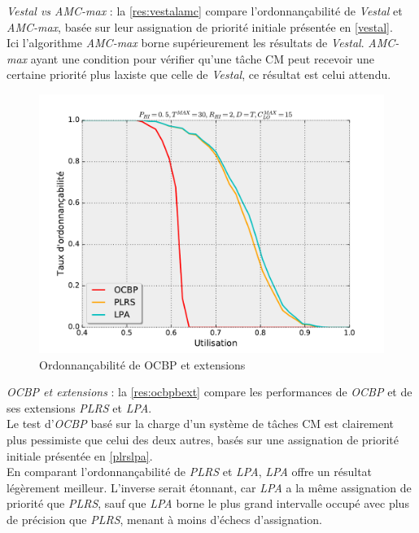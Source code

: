 \documentclass[12pt,a4paper,oneside]{book}
\theoremstyle{break}
\theoremstyle{breakplain}
\begin{document}
\textit{Vestal vs AMC-max} : la \autoref{res:vestalamc} compare l'ordonnançabilité de \textit{Vestal} et \textit{AMC-max}, basée sur leur assignation de priorité initiale présentée en \autoref{vestal}.\\
Ici l'algorithme \textit{AMC-max} borne supérieurement les résultats de \textit{Vestal}. \textit{AMC-max} ayant une condition pour vérifier qu'une tâche CM peut recevoir une certaine priorité plus laxiste que celle de \textit{Vestal}, ce résultat est celui attendu.\\

\pagebreak

\begin{figure}[h]
\includegraphics[width=\textwidth]{./results/perfOCBPetc.pdf}
\caption{Ordonnançabilité de OCBP et extensions}
\label{res:ocbpbext}
\end{figure}

\textit{OCBP et extensions} : la \autoref{res:ocbpbext} compare les performances de \textit{OCBP} et de ses extensions \textit{PLRS} et \textit{LPA}.\\
Le test d'\textit{OCBP} basé sur la charge d'un système de tâches CM est clairement plus pessimiste que celui des deux autres, basés sur une assignation de priorité initiale présentée en \autoref{plrslpa}.\\

En comparant l'ordonnançabilité de \textit{PLRS} et \textit{LPA}, \textit{LPA} offre un résultat légèrement meilleur. L'inverse serait étonnant, car \textit{LPA} a la même assignation de priorité que \textit{PLRS}, sauf que \textit{LPA} borne le plus grand intervalle occupé avec plus de précision que \textit{PLRS}, menant à moins d'échecs d'assignation.\\
\end{document}
